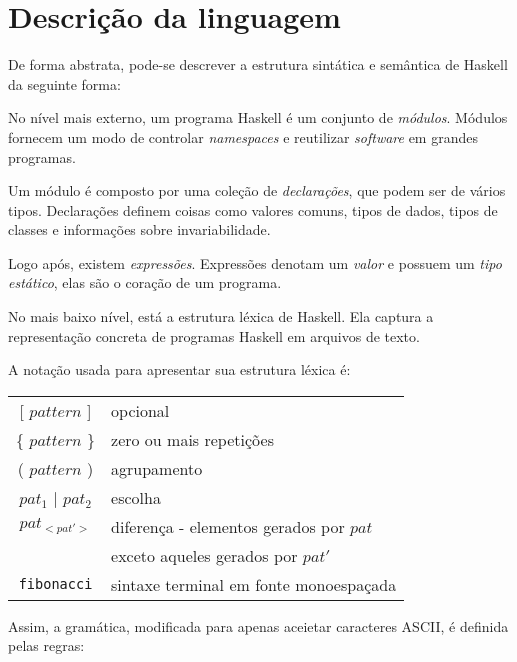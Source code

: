\documentclass[
	article,			%
	11pt,				%
	oneside,			%
	a4paper,			%
	english,			%
	brazil,				%
	sumario=tradicional
	]{abntex2}
\begin{document}
\section{Descrição da linguagem}

De forma abstrata, pode-se descrever a estrutura sintática e semântica
de Haskell da seguinte forma:

No nível mais externo, um programa Haskell é um conjunto de
\textit{módulos}. Módulos fornecem um modo de controlar \textit{namespaces}
e reutilizar \textit{software} em grandes programas.

Um módulo é composto por uma coleção de \textit{declarações}, que podem
ser de vários tipos. Declarações definem coisas como valores comuns,
tipos de dados, tipos de classes e informações sobre invariabilidade.

Logo após, existem \textit{expressões}. Expressões denotam um \textit{valor}
e possuem um \textit{tipo estático}, elas são o coração de um programa.

No mais baixo nível, está a estrutura léxica de Haskell. Ela captura a 
representação concreta de programas Haskell em arquivos de texto.

A notação usada para apresentar sua estrutura léxica é:


\begin{center}
\begin{tabular}{ c l } 
	[ $ pattern $ ]     & opcional \\ 
	\{ $ pattern $ \} & zero ou mais repetições \\ 
	( $ pattern $ )     & agrupamento \\ 
	$pat_1$ | $pat_2$  & escolha \\ 
	$ pat_{<pat'>} $   & diferença - elementos gerados por $pat$ \\
					   & exceto aqueles gerados por $pat'$ \\ 
	\texttt{fibonacci} & sintaxe terminal em fonte monoespaçada \\ 
\end{tabular}
\end{center}
	
Assim, a gramática, modificada para apenas aceietar caracteres
ASCII, é definida pelas regras:
\end{document}
